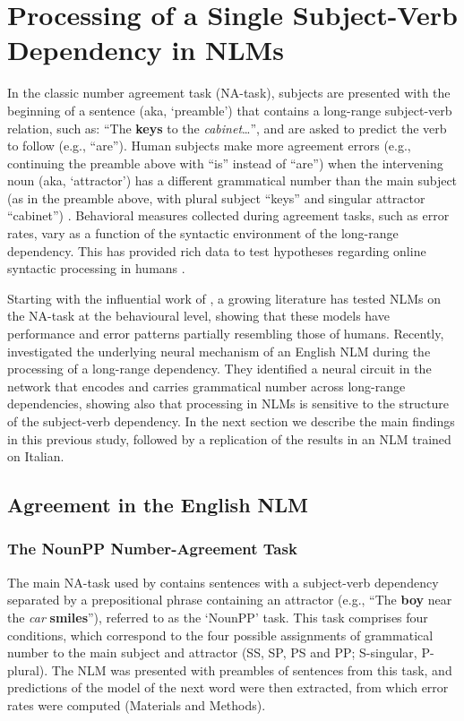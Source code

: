 \section{Processing of a Single Subject-Verb Dependency in NLMs}
In the classic number agreement task (NA-task), subjects are presented with the beginning of a sentence (aka, `preamble') that contains a long-range subject-verb relation, such as: ``The \textbf{keys} to the \emph{cabinet}\ldots'', and are asked to predict the verb to follow (e.g., ``are''). 
Human subjects make more agreement errors (e.g., continuing the preamble  above with ``is'' instead of ``are'') when the intervening noun (aka, `attractor') has a different grammatical number than the main subject (as in the preamble above, with plural subject ``keys'' and singular attractor ``cabinet'') \citep{Bock:Miller:1991}.
Behavioral measures collected during agreement tasks, such as error rates, vary as a function of the syntactic environment of the long-range dependency. This has provided rich data to test hypotheses regarding online syntactic processing in humans \citep[e.g., ][]{franck2002subject, franck2006agreement, franck2007syntactic}.

Starting with the influential work of \citet{Linzen:etal:2016}, a growing
literature \citep[e.g.,][]{Gulordava:etal:2018, Bernardy:Lappin:2017,
  Giulianelli:etal:2018, Kuncoro:etal:2018a,Linzen:Leonard:2018,jumelet2019analysing} has
tested NLMs on the NA-task at the behavioural level, showing that these models have performance and error patterns partially resembling those of humans.
Recently, \citet{lakretz2019emergence} investigated the underlying neural mechanism of an English NLM during the processing of a long-range dependency. They identified a neural circuit in the network that encodes and carries grammatical number across long-range dependencies, showing also that processing in NLMs is sensitive to the structure of the subject-verb dependency. 
In the next section we describe the main findings in this previous study, followed by a replication of the results in an NLM trained on Italian. 

\subsection{Agreement in the English NLM}

\subsubsection{The NounPP Number-Agreement Task}
The main NA-task used by \citet{lakretz2019emergence} contains sentences with a subject-verb dependency separated by a prepositional phrase containing an attractor (e.g., ``The \textbf{boy} near the \emph{car} \textbf{smiles}''), referred to as the `NounPP' task. This task comprises four conditions, which correspond to the four possible assignments of grammatical number to the main subject and attractor (SS, SP, PS and PP; S-singular, P-plural). The NLM was presented with preambles of sentences from this task, and predictions of the model of the next word were then extracted, from which error rates were computed (Materials and Methods). 

